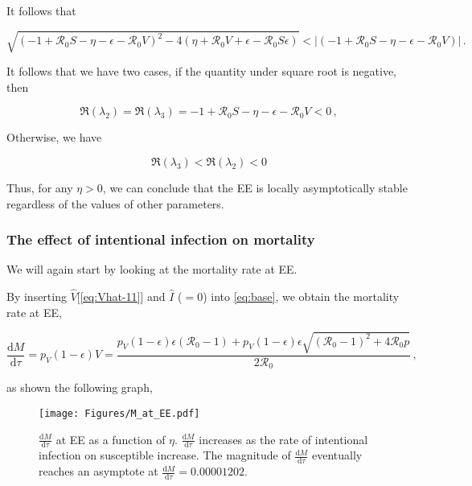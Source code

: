 \documentclass[12pt]{article}
\newcommand\dbyd[2]{\frac{\mathrm d{#1}}{\mathrm d{#2}}}
\newcommand{\R}{\mathcal{R}}
\newcommand{\pmV}{p_{V}}
\begin{document}
It follows that
\begin{linenomath*}
\begin{equation}
\sqrt{(-1+\R_0 S-\eta-\epsilon-\R_0 V)^2-4(\eta+\R_0 V+\epsilon-\R_0 S\epsilon)}<|(-1+\R_0 S-\eta-\epsilon-\R_0 V)|\,.
\end{equation}
\end{linenomath*}

It follows that we have two cases, if the quantity under square root is negative, then
\begin{linenomath*}
\begin{equation}
\Re(\lambda_2)=\Re(\lambda_3)=-1+\R_0 S-\eta-\epsilon-\R_0 V<0\,,
\end{equation}
\end{linenomath*}

Otherwise, we have
\begin{linenomath*}
\begin{equation}
\Re(\lambda_3)<\Re(\lambda_2)<0
\end{equation}
\end{linenomath*}

Thus, for any $\eta>0$, we can conclude that the EE is locally asymptotically stable regardless of the values of other parameters.

\subsubsection{The effect of intentional infection on mortality}
We will again start by looking at the mortality rate at EE.

By inserting $\hat{V}$[\autoref{eq:Vhat-11}] and $\hat{I}$ ($=0$) into \autoref{eq:base}, we obtain the mortality rate at EE,
\begin{linenomath*}
\begin{equation}
\dbyd{M}{\tau}=\pmV(1-\epsilon)V=\frac{\pmV(1-\epsilon)\epsilon(\R_0 -1)+ \pmV(1-\epsilon)\epsilon \sqrt{(\R_0-1)^2+4\R_0 p}}{2\R_0}\,, \label{eq:dMdt}
\end{equation}
\end{linenomath*}
as shown the following graph,
\begin{figure}[H]
  \centering
  \texttt{[image: Figures/M\_at\_EE.pdf]}
  \caption{$\dbyd{M}{\tau}$ at EE as a function of $\eta$. $\dbyd{M}{\tau}$ increases as the rate of intentional infection on susceptible increase. The magnitude of $\dbyd{M}{\tau}$ eventually reaches an asymptote at $\dbyd{M}{\tau}=0.00001202$.}
\end{figure}
\end{document}
